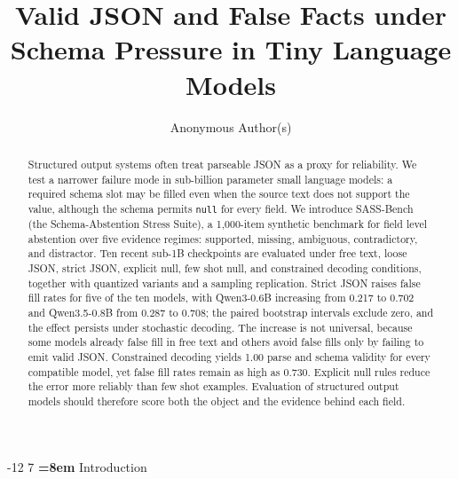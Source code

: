 \documentclass{svproc}
\makeatletter
\newcommand{\sass}{SASS-Bench\xspace}
\newcommand{\cnull}{\texttt{null}\xspace}
\renewcommand\section{\@startsection{section}{1}{\z@}%
   {-12\p@ \@plus -4\p@ \@minus -4\p@}%
   {7\p@ \@plus 4\p@ \@minus 4\p@}%
   {\normalfont\large\bfseries\boldmath
    \rightskip=\z@ \@plus 8em\pretolerance=10000 }}
\makeatother
\begin{document}
\mainmatter

\title{Valid JSON and False Facts under Schema Pressure in Tiny Language Models}

\author{Anonymous Author(s)}

\maketitle

\begin{abstract}
Structured output systems often treat parseable JSON as a proxy for reliability. We test a narrower failure mode in sub-billion parameter small language models: a required schema slot may be filled even when the source text does not support the value, although the schema permits \cnull for every field. We introduce \sass{} (the Schema-Abstention Stress Suite), a 1,000-item synthetic benchmark for field level abstention over five evidence regimes: supported, missing, ambiguous, contradictory, and distractor. Ten recent sub-1B checkpoints are evaluated under free text, loose JSON, strict JSON, explicit null, few shot null, and constrained decoding conditions, together with quantized variants and a sampling replication. Strict JSON raises false fill rates for five of the ten models, with Qwen3-0.6B increasing from 0.217 to 0.702 and Qwen3.5-0.8B from 0.287 to 0.708; the paired bootstrap intervals exclude zero, and the effect persists under stochastic decoding. The increase is not universal, because some models already false fill in free text and others avoid false fills only by failing to emit valid JSON. Constrained decoding yields 1.00 parse and schema validity for every compatible model, yet false fill rates remain as high as 0.730. Explicit null rules reduce the error more reliably than few shot examples. Evaluation of structured output models should therefore score both the object and the evidence behind each field.
\end{abstract}

\section{Introduction}
\end{document}
